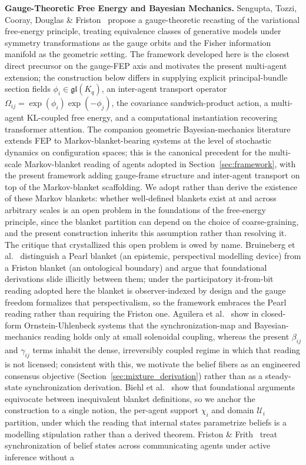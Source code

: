 \documentclass[11pt]{article}
\begin{document}
\textbf{Gauge-Theoretic Free Energy and Bayesian Mechanics.} Sengupta, Tozzi, Cooray, Douglas \& Friston~\cite{Sengupta2016NeuronalGauge} propose a gauge-theoretic recasting of the variational free-energy principle, treating equivalence classes of generative models under symmetry transformations as the gauge orbits and the Fisher information manifold as the geometric setting. The framework developed here is the closest direct precursor on the gauge-FEP axis and motivates the present multi-agent extension; the construction below differs in supplying explicit principal-bundle section fields $\phi_i \in \mathfrak{gl}(K_q)$, an inter-agent transport operator $\Omega_{ij} = \exp(\phi_i)\exp(-\phi_j)$, the covariance sandwich-product action, a multi-agent KL-coupled free energy, and a computational instantiation recovering transformer attention. The companion geometric Bayesian-mechanics literature~\cite{friston2019particular, dacosta2021bayesian, ramstead2023bayesian, Sakthivadivel2022, KirchhoffParrPalaciosFristonKiverstein2018} extends FEP to Markov-blanket-bearing systems at the level of stochastic dynamics on configuration spaces; this is the canonical precedent for the multi-scale Markov-blanket reading of agents adopted in Section~\ref{sec:framework}, with the present framework adding gauge-frame structure and inter-agent transport on top of the Markov-blanket scaffolding. We adopt rather than derive the existence of these Markov blankets: whether well-defined blankets exist at and across arbitrary scales is an open problem in the foundations of the free-energy principle, since the blanket partition can depend on the choice of coarse-graining, and the present construction inherits this assumption rather than resolving it. The critique that crystallized this open problem is owed by name. Bruineberg et al.~\cite{bruineberg2022emperor} distinguish a Pearl blanket (an epistemic, perspectival modelling device) from a Friston blanket (an ontological boundary) and argue that foundational derivations slide illicitly between them; under the participatory it-from-bit reading adopted here the blanket is observer-indexed by design and the gauge freedom formalizes that perspectivalism, so the framework embraces the Pearl reading rather than requiring the Friston one. Aguilera et al.~\cite{aguilera2022particular} show in closed-form Ornstein-Uhlenbeck systems that the synchronization-map and Bayesian-mechanics reading holds only at small solenoidal coupling, whereas the present $\beta_{ij}$ and $\gamma_{ij}$ terms inhabit the dense, irreversibly coupled regime in which that reading is not licensed; consistent with this, we motivate the belief fibers as an engineered consensus objective (Section~\ref{sec:mixture_derivation}) rather than as a steady-state synchronization derivation. Biehl et al.~\cite{biehl2021technical} show that foundational arguments equivocate between inequivalent blanket definitions, so we anchor the construction to a single notion, the per-agent support $\chi_i$ and domain $\mathcal{U}_i$ partition, under which the reading that internal states parametrize beliefs is a modelling stipulation rather than a derived theorem. Friston \& Frith~\cite{FristonFrith2015duet} treat synchronization of belief states across communicating agents under active inference without a 
\end{document}
